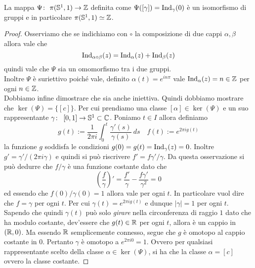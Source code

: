 \begin{theorem}
    La mappa $\Psi \colon\ \pi(\mathbb{S}^1, 1) \rightarrow \mathbb{Z}$ definita come $\Psi(\left[
    \gamma \right]) = \operatorname{Ind}_\gamma(0)$ è un isomorfismo di gruppi
    e in particolare $\pi(\mathbb{S}^1, 1) \simeq \mathbb{Z}$.
    \label{thr:gruppo-fondamentale-della-circonferenza}
\end{theorem}
\begin{proof}
    Osserviamo che se indichiamo con $\circ$ la composizione di due cappi
    $\alpha, \beta$ allora vale che 
    \begin{equation*}
      \operatorname{Ind}_{\alpha \circ \beta}(z)
      = \operatorname{Ind}_\alpha(z) + \operatorname{Ind}_\beta(z) 
    \end{equation*}
    quindi vale che $\Psi$ sia un omomorfismo tra i due gruppi. \\

    Inoltre $\Psi$ è suriettivo poiché vale, definito $\alpha(t)
    = e^{in\pi}$ vale $\operatorname{Ind}_\alpha(z) = n \in \mathbb{Z}$ per ogni $n
    \in \mathbb{Z}$. \\

    Dobbiamo infine dimostrare che sia anche iniettiva. Quindi dobbiamo
    mostrare che $\operatorname{ker}(\Psi) = \{\left[ c \right]\}$. Per cui
    prendiamo una classe $\left[ \alpha \right] \in
    \operatorname{ker}(\Psi)$ e un suo rappresentante
    $\gamma \colon\ \left[ 0,1 \right] \rightarrow \mathbb{S}^1 \subset \mathbb{C}$. Poniamo $t
    \in I$ allora definiamo 
    \begin{equation*}
      g(t) := \frac{1}{2\pi i} \int^t_0 \frac{\gamma'(s)}{\gamma(s)}\ ds
      \quad f(t) := e^{2\pi i g(t)}
    \end{equation*}
    la funzione $g$ soddisfa le condizioni $g(0) = g(t)
    = \operatorname{Ind}_\gamma(z) = 0$. Inoltre $g' = \gamma' / (2\pi
    i \gamma)$ e quindi si può riscrivere $f' = f\gamma' / \gamma$. Da
    questa osservazione si può dedurre che $f/\gamma$ è una funzione
    costante dato che 
    \begin{equation*}
      \left(\frac{f}{\gamma}\right)' = \frac{f'}{\gamma}
      - \frac{f\gamma'}{\gamma^2} = 0
    \end{equation*}
    ed essendo che $f(0)/\gamma(0) = 1$ allora vale per ogni $t$. In
    particolare vuol dire che $f = \gamma$ per ogni $t$. Per cui $\gamma(t)
    = e^{2\pi i g(t)}$ e dunque $|\gamma| = 1$ per ogni $t$. 
    Sapendo che quindi $\gamma(t)$ può solo \textit{girare} nella
    circonferenza di raggio $1$ dato che ha modulo costante, dev'essere che 
    $g(t) \in \mathbb{R}$ per ogni $t$, allora è un cappio in $(\mathbb{R}, 0)$. Ma essendo
    $\mathbb{R}$ semplicemente connesso, segue che $g$ è omotopo al cappio
    costante in $0$.
    Pertanto $\gamma$ è omotopo a $e^{2\pi i 0} = 1$. Ovvero per qualsiasi
    rappresentante scelto della classe $\alpha \in \operatorname{ker}(\Psi)$, 
    si ha che la classe $\alpha = \left[c\right]$ ovvero la classe costante. 
\end{proof}

